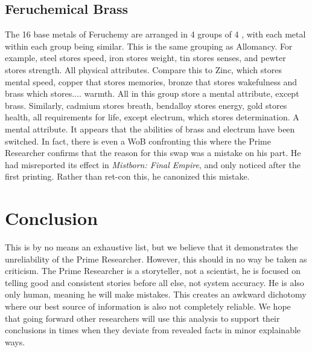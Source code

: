 \documentclass[conference]{IEEEtran}
\begin{document}
\subsection{Feruchemical Brass}
The 16 base metals of Feruchemy are arranged in 4 groups of 4\cite{feruchemy} , with each metal within each group being similar.  This is the same grouping as Allomancy. For example, steel stores speed, iron stores weight, tin stores senses, and pewter stores strength.  All physical attributes.  Compare this to Zinc, which stores mental speed, copper that stores memories, bronze that stores wakefulness and brass which stores.... warmth.  All in this group store a mental attribute, except brass.  Similarly, cadmium stores breath, bendalloy stores energy, gold stores health, all requirements for life, except electrum, which stores determination.  A mental attribute.  It appears that the abilities of brass and electrum have been switched.  In fact, there is even a WoB confronting this\cite{mistake} where the Prime Researcher confirms that the reason for this swap was a mistake on his part.  He had misreported its effect in \emph{Mistborn: Final Empire}, and only noticed after the first printing.  Rather than ret-con this, he canonized this mistake.
\section{Conclusion}
This is by no means an exhaustive list, but we believe that it demonstrates the unreliability of the Prime Researcher.  However, this should in no way be taken as criticism.  The Prime Researcher is a storyteller, not a scientist, he is focused on telling good and consistent stories before all else, not system accuracy.  He is also only human, meaning he will make mistakes.
This creates an awkward dichotomy where our best source of information is also not completely reliable.  We hope that going forward other researchers will use this analysis to support their conclusions in times when they deviate from revealed facts in minor explainable ways.


\newpage{}
{}

\end{document}
